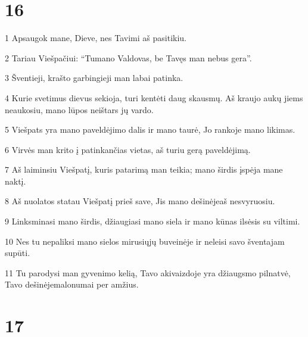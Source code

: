 \chapter{16}


\par 1 Apsaugok mane, Dieve, nes Tavimi aš pasitikiu. 
\par 2 Tariau Viešpačiui: “Tu­mano Valdovas, be Tavęs man nebus gera”. 
\par 3 Šventieji, krašto garbingieji man labai patinka. 
\par 4 Kurie svetimus dievus sekioja, turi kentėti daug skausmų. Aš kraujo aukų jiems neaukosiu, mano lūpos neištars jų vardo. 
\par 5 Viešpats yra mano paveldėjimo dalis ir mano taurė, Jo rankoje mano likimas. 
\par 6 Virvės man krito į patinkančias vietas, aš turiu gerą paveldėjimą. 
\par 7 Aš laiminsiu Viešpatį, kuris patarimą man teikia; mano širdis įspėja mane naktį. 
\par 8 Aš nuolatos statau Viešpatį prieš save, Jis mano dešinėje­aš nesvyruosiu. 
\par 9 Linksminasi mano širdis, džiaugiasi mano siela ir mano kūnas ilsėsis su viltimi. 
\par 10 Nes tu nepaliksi mano sielos mirusiųjų buveinėje ir neleisi savo šventajam supūti. 
\par 11 Tu parodysi man gyvenimo kelią, Tavo akivaizdoje yra džiaugsmo pilnatvė, Tavo dešinėje­malonumai per amžius.



\chapter{17}


